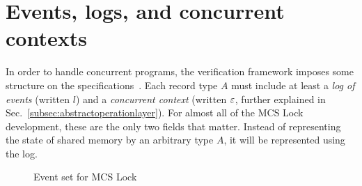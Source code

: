 %
%

\section{Events, logs, and concurrent contexts}
\label{subsec:eventlogandoracle}

In order to handle concurrent programs, the verification framework
imposes some structure on the specifications~\cite{ccal16}.  Each
record type $A$ must include at least a \emph{log of events} (written
$l$) and a \emph{concurrent context} (written $\oracle$, further
explained in Sec.~\ref{subsec:abstractoperationlayer}). For almost
all of the MCS Lock development, these are the only two fields that
matter. Instead of representing the state of shared
memory by an arbitrary type $A$, it will be represented using the log.

\begin{figure}
\begin{minipage}{\linewidth}

\end{minipage}
\caption{Event set for MCS Lock}
\label{fig:lock_event_type}
\end{figure}

